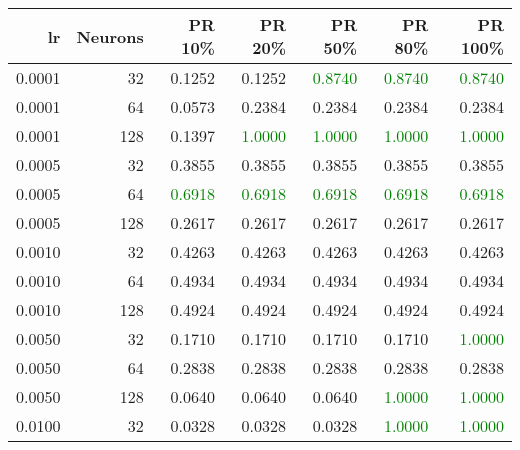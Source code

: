 \begin{tabular}{rrrrrrr}
\toprule
lr & Neurons & PR 10\% & PR 20\% & PR 50\% & PR 80\% & PR 100\% \\
\midrule
0.0001 & 32 & \textcolor{blu} {0.1252} & \textcolor{blu} {0.1252} & \textcolor{green} {0.8740} & \textcolor{green} {0.8740} & \textcolor{green} {0.8740} \\
0.0001 & 64 & \textcolor{blu} {0.0573} & \textcolor{blu} {0.2384} & \textcolor{blu} {0.2384} & \textcolor{blu} {0.2384} & \textcolor{blu} {0.2384} \\
0.0001 & 128 & \textcolor{blu} {0.1397} & \textcolor{green} {1.0000} & \textcolor{green} {1.0000} & \textcolor{green} {1.0000} & \textcolor{green} {1.0000} \\
0.0005 & 32 & \textcolor{blu} {0.3855} & \textcolor{blu} {0.3855} & \textcolor{blu} {0.3855} & \textcolor{blu} {0.3855} & \textcolor{blu} {0.3855} \\
0.0005 & 64 & \textcolor{green} {0.6918} & \textcolor{green} {0.6918} & \textcolor{green} {0.6918} & \textcolor{green} {0.6918} & \textcolor{green} {0.6918} \\
0.0005 & 128 & \textcolor{blu} {0.2617} & \textcolor{blu} {0.2617} & \textcolor{blu} {0.2617} & \textcolor{blu} {0.2617} & \textcolor{blu} {0.2617} \\
0.0010 & 32 & \textcolor{blu} {0.4263} & \textcolor{blu} {0.4263} & \textcolor{blu} {0.4263} & \textcolor{blu} {0.4263} & \textcolor{blu} {0.4263} \\
0.0010 & 64 & \textcolor{blu} {0.4934} & \textcolor{blu} {0.4934} & \textcolor{blu} {0.4934} & \textcolor{blu} {0.4934} & \textcolor{blu} {0.4934} \\
0.0010 & 128 & \textcolor{blu} {0.4924} & \textcolor{blu} {0.4924} & \textcolor{blu} {0.4924} & \textcolor{blu} {0.4924} & \textcolor{blu} {0.4924} \\
0.0050 & 32 & \textcolor{blu} {0.1710} & \textcolor{blu} {0.1710} & \textcolor{blu} {0.1710} & \textcolor{blu} {0.1710} & \textcolor{green} {1.0000} \\
0.0050 & 64 & \textcolor{blu} {0.2838} & \textcolor{blu} {0.2838} & \textcolor{blu} {0.2838} & \textcolor{blu} {0.2838} & \textcolor{blu} {0.2838} \\
0.0050 & 128 & \textcolor{blu} {0.0640} & \textcolor{blu} {0.0640} & \textcolor{blu} {0.0640} & \textcolor{green} {1.0000} & \textcolor{green} {1.0000} \\
0.0100 & 32 & \textcolor{blu} {0.0328} & \textcolor{blu} {0.0328} & \textcolor{blu} {0.0328} & \textcolor{green} {1.0000} & \textcolor{green} {1.0000} \\

\end{tabular}
